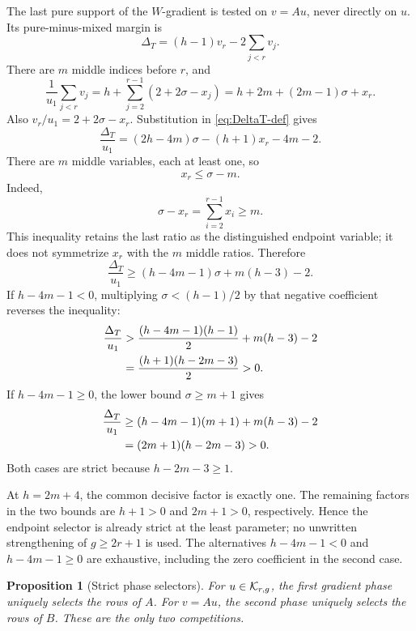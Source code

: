 \documentclass[11pt]{article}
\newtheorem{proposition}[theorem]{Proposition}
\theoremstyle{remark}
\numberwithin{equation}{section}
\begin{document}
The last pure support of the \(W\)-gradient is tested on \(v=Au\), never
directly on \(u\).  Its pure-minus-mixed margin is
\begin{equation}\label{eq:DeltaT-def}
\Delta_T=(h-1)v_r-2\sum_{j<r}v_j.
\end{equation}
There are \(m\) middle indices before \(r\), and
\[
\frac1{u_1}\sum_{j<r}v_j
=h+\sum_{j=2}^{r-1}(2+2\sigma-x_j)
=h+2m+(2m-1)\sigma+x_r.
\]
Also \(v_r/u_1=2+2\sigma-x_r\).  Substitution in
\eqref{eq:DeltaT-def} gives
\begin{equation}\label{eq:DeltaT}
\frac{\Delta_T}{u_1}
=(2h-4m)\sigma-(h+1)x_r-4m-2.
\end{equation}
There are \(m\) middle variables, each at least one, so
\begin{equation}\label{eq:xr-upper}
x_r\leq\sigma-m.
\end{equation}
Indeed,
\[
\sigma-x_r=\sum_{i=2}^{r-1}x_i\geq m.
\]
This inequality retains the last ratio as the distinguished endpoint
variable; it does not symmetrize \(x_r\) with the \(m\) middle ratios.
Therefore
\begin{equation}\label{eq:DeltaT-reduced}
\frac{\Delta_T}{u_1}
\geq(h-4m-1)\sigma+m(h-3)-2.
\end{equation}
If \(h-4m-1<0\), multiplying
\(\sigma<(h-1)/2\) by that negative coefficient reverses the inequality:
\begin{align}
\frac{\Delta_T}{u_1}
&>\frac{(h-4m-1)(h-1)}2+m(h-3)-2 \notag\\
&=\frac{(h+1)(h-2m-3)}2>0.
\label{eq:DeltaT-negative}
\end{align}
If \(h-4m-1\geq0\), the lower bound \(\sigma\geq m+1\) gives
\begin{align}
\frac{\Delta_T}{u_1}
&\geq(h-4m-1)(m+1)+m(h-3)-2 \notag\\
&=(2m+1)(h-2m-3)>0.
\label{eq:DeltaT-positive}
\end{align}
Both cases are strict because \(h-2m-3\geq1\).

At \(h=2m+4\), the common decisive factor is exactly one.  The remaining
factors in the two bounds are \(h+1>0\) and \(2m+1>0\), respectively.
Hence the endpoint selector is already strict at the least parameter; no
unwritten strengthening of \(g\geq2r+1\) is used.  The alternatives
\(h-4m-1<0\) and \(h-4m-1\geq0\) are exhaustive, including the zero
coefficient in the second case.

\begin{proposition}[Strict phase selectors]\label{prop:selectors}
For \(u\in\mathcal{K}_{r,g}\), the first gradient phase uniquely selects the rows
of \(A\).  For \(v=Au\), the second phase uniquely selects the rows of
\(B\).  These are the only two competitions.
\end{proposition}
\end{document}
